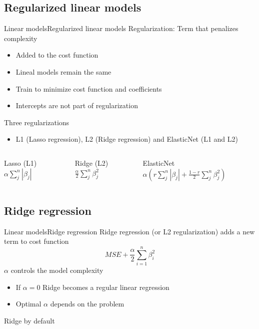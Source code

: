 \documentclass[10pt,compress]{beamer} %
\begin{document}
\subsection{Regularized linear models}
\begin{frame}{Linear models}{Regularized linear models}
	\alert{Regularization}: Term that penalizes complexity
	\begin{itemize}
		\item Added to the cost function
        \item Lineal models remain the same
        \item Train to minimize cost function and coefficients
        \item Intercepts are not part of regularization
	\end{itemize}

    Three regularizations
	\begin{itemize}
		\item L1 (Lasso regression),  L2 (Ridge regression) and ElasticNet (L1 and L2)
	\end{itemize}

    \begin{columns}
    		\begin{block}{Lasso (L1)}
            	$\alpha \sum_j^n |\beta_j|$
        	\end{block}

     		\begin{block}{Ridge (L2)}
            	$\frac{\alpha}{2} \sum_j^n \beta_j^2$
        	\end{block}

     		\begin{block}{ElasticNet}
			   $\alpha \left( r \sum_j^n |\beta_j| + \frac{1-r}{2} \sum_j^n \beta_j^2 \right)$
        	\end{block}
    \end{columns}
\end{frame}

\subsection{Ridge regression}
\begin{frame}{Linear models}{Ridge regression}
	Ridge regression (or L2 regularization) adds a new term to cost function
    \begin{equation*}
        MSE + \frac{\alpha}{2} \sum_{i=1}^n \beta_i^2
    \end{equation*}
    $\alpha$ controls the model complexity
	\begin{itemize}
		\item If $\alpha = 0$ Ridge becomes a regular linear regression
        \item Optimal $\alpha$ depends on the problem
	\end{itemize}
    Ridge by default
\end{frame}
\end{document}
